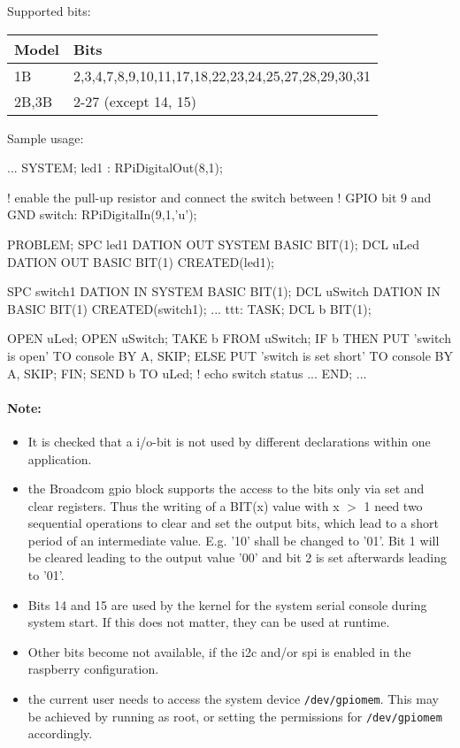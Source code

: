 Supported bits:

\begin{tabular}{|l|l|}
\hline
Model & Bits \\
\hline
1B & 2,3,4,7,8,9,10,11,17,18,22,23,24,25,27,28,29,30,31 \\
\hline
2B,3B & 2-27 (except 14, 15) \\
\hline
\end{tabular}  

Sample usage:
\begin{PEARLCode}
...
SYSTEM;
  led1 : RPiDigitalOut(8,1);

  ! enable the pull-up resistor and connect the switch between 
  ! GPIO bit 9 and GND
  switch: RPiDigitalIn(9,1,'u');

PROBLEM;
   SPC led1 DATION OUT SYSTEM BASIC BIT(1);
   DCL uLed DATION OUT BASIC BIT(1) CREATED(led1);

   SPC switch1 DATION IN SYSTEM BASIC BIT(1);
   DCL uSwitch DATION IN BASIC BIT(1) CREATED(switch1);
...
ttt: TASK;
   DCL b BIT(1);

   OPEN uLed;
   OPEN uSwitch;
   TAKE b FROM uSwitch;
   IF b THEN
      PUT 'switch is open' TO console BY A, SKIP;
   ELSE
      PUT 'switch is set short' TO console BY A, SKIP;
   FIN;
   SEND b TO uLed;  ! echo switch status
...
END;
...
\end{PEARLCode}

\paragraph{Note:}  
\begin{itemize}
\item It is checked that a i/o-bit is not used by different declarations within
one application.
\item the Broadcom gpio block supports the access to the bits only 
via set and clear registers. Thus the writing of a BIT(x) value with x $>$ 1
need two sequential operations to clear and set the output bits, which lead
to a short period of an intermediate value. E.g. '10' shall be changed to '01'. Bit 1 will be cleared leading to the output value '00' and bit 2 
is set afterwards leading to '01'.

\item Bits 14 and 15 are used by the kernel for the 
  system serial console during system start. If this does not matter,
  they can be used at runtime.
\item Other bits become not available, if 
  the i2c and/or spi is enabled in the
  raspberry configuration.
\item the current user needs to access the system device 
  \verb|/dev/gpiomem|. This may be achieved by running as root, or setting
  the permissions for \verb|/dev/gpiomem| accordingly.
\end{itemize}
 
